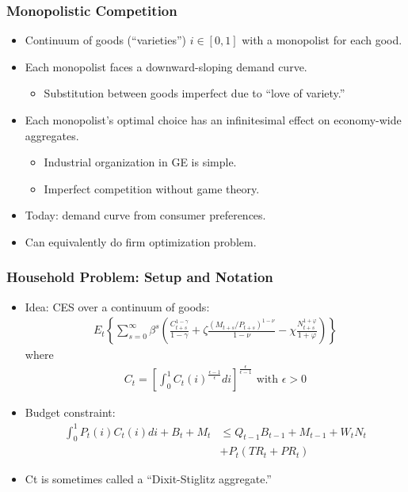 \documentclass[english,xcolor=svgnames]{beamer}
\begin{document}
\begin{frame}
\frametitle{Monopolistic Competition}
\begin{itemize}
	\item Continuum of goods (``varieties'') $i\in [0, 1]$ with a monopolist for each good.
	\item Each monopolist faces a downward-sloping demand curve.
	\begin{itemize}
		\item Substitution between goods imperfect due to ``love of variety.''
	\end{itemize}
	\item Each monopolist's optimal choice has an infinitesimal effect on economy-wide aggregates.
	\begin{itemize}
		\item Industrial organization in GE is simple.
		\item Imperfect competition without game theory.
	\end{itemize}
	\item Today: demand curve from consumer preferences.
	\item Can equivalently do firm optimization problem.
\end{itemize}
\end{frame}



\begin{frame}
\frametitle{Household Problem: Setup and Notation}
\begin{itemize}
\item Idea: CES over a continuum of goods:
\begin{align*}
	E_t \left\{\sum_{s=0}^{\infty}\beta^s\left(\frac{C_{t+s}^{1-\gamma}}{1-\gamma}+\zeta\frac{(M_{t+s}/P_{t+s})^{1-\nu}}{1-\nu}-\chi \frac{N_{t+s}^{1+\varphi}}{1+\varphi}\right)\right\}
\end{align*}
where
\begin{align*}C_t=\left[\int_0^1C_t(i)^{\frac{\epsilon-1}{\epsilon}}di\right]^{\frac{\epsilon}{\epsilon-1}}\text{ with }\epsilon>0
\end{align*}
	\item Budget constraint:
\begin{align*}
		\int_0^1 P_t(i) C_{t}(i)di+B_t+M_t&\le Q_{t-1}B_{t-1}+M_{t-1}+W_t N_t \\& + P_{t}(TR_t+PR_t)
	\end{align*}	
	\item Ct is sometimes called a ``Dixit-Stiglitz aggregate.''
\end{itemize}
\end{frame}
\end{document}
